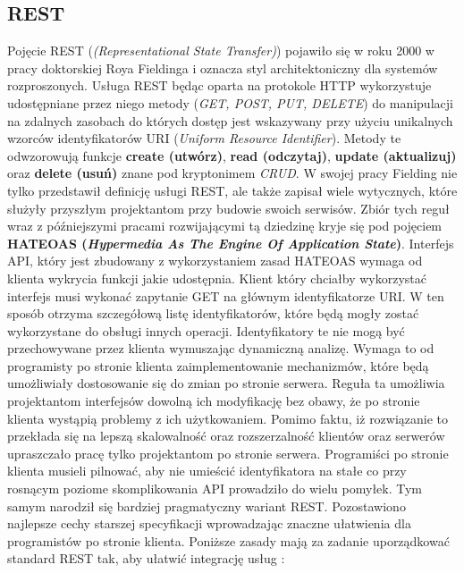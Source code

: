 \subsection{REST}
Pojęcie REST (\textit{(Representational State Transfer)}) pojawiło się w roku 2000 w pracy doktorskiej Roya Fieldinga \cite{thomas2000architectural} i oznacza styl architektoniczny dla systemów rozproszonych. Usługa REST będąc oparta na protokole HTTP wykorzystuje udostępniane przez niego metody (\textit{GET, POST, PUT, DELETE}) do manipulacji na zdalnych zasobach do których dostęp jest wskazywany przy użyciu unikalnych wzorców identyfikatorów URI (\textit{Uniform Resource Identifier}). Metody te odwzorowują funkcje \textbf{create (utwórz)}, \textbf{read (odczytaj)}, \textbf{update (aktualizuj)} oraz \textbf{delete (usuń)} znane pod kryptonimem \textit{CRUD}.\@
W swojej pracy Fielding nie tylko przedstawił definicję usługi REST, ale także zapisał wiele wytycznych, które służyły przyszłym projektantom przy budowie swoich serwisów. Zbiór tych reguł wraz z późniejszymi pracami rozwijającymi tą dziedzinę kryje się pod pojęciem \textbf{HATEOAS (\textit{Hypermedia As The Engine Of Application State})}. Interfejs API, który jest zbudowany z wykorzystaniem zasad HATEOAS wymaga od klienta wykrycia funkcji jakie udostępnia. Klient który chciałby wykorzystać interfejs musi wykonać zapytanie GET na głównym identyfikatorze URI. W ten sposób otrzyma szczegółową listę identyfikatorów, które będą mogły zostać wykorzystane do obsługi innych operacji. Identyfikatory te nie mogą być przechowywane przez klienta wymuszając dynamiczną analizę. Wymaga to od programisty po stronie klienta zaimplementowanie mechanizmów, które będą umożliwiały dostosowanie się do zmian po stronie serwera. Reguła ta umożliwia projektantom interfejsów dowolną ich modyfikację bez obawy, że po stronie klienta wystąpią problemy z ich użytkowaniem. Pomimo faktu, iż rozwiązanie to przekłada się na lepszą skalowalność oraz rozszerzalność klientów oraz serwerów upraszczało pracę tylko projektantom po stronie serwera. Programiści po stronie klienta musieli pilnować, aby nie umieścić identyfikatora na stałe co przy rosnącym poziome skomplikowania API prowadziło do wielu pomyłek. Tym samym narodził się bardziej pragmatyczny wariant REST. Pozostawiono najlepsze cechy starszej specyfikacji wprowadzając znaczne ułatwienia dla programistów po stronie klienta.
Poniższe zasady mają za zadanie uporządkować standard REST tak, aby ułatwić integrację usług \cite{jacobson2015interfejsapi}:
